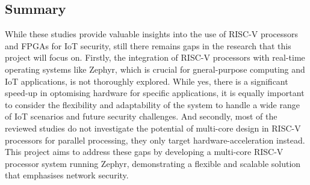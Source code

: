 \subsection{Summary}
While these studies provide valuable insights into the use of RISC-V processors and FPGAs for IoT security, still there remains gaps in the research that this project will focus on. Firstly, the integration of RISC-V processors with real-time operating systems like Zephyr, which is crucial for gneral-purpose computing and IoT applications, is not thoroughly explored. While yes, there is a significant speed-up in optomising hardware for specific applications, it is equally important to consider the flexibility and adaptability of the system to handle a wide range of IoT scenarios and future security challenges. And secondly, most of the reviewed studies do not investigate the potential of multi-core design in RISC-V processors for parallel processing, they only target hardware-acceleration instead. This project aims to address these gaps by developing a multi-core RISC-V processor system running Zephyr, demonstrating a flexible and scalable solution that emphasises network security.
